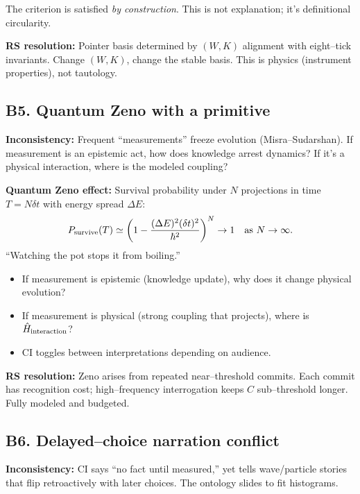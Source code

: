 \documentclass[11pt]{article}
\begin{document}
The criterion is satisfied \emph{by construction}. This is not explanation; it's definitional circularity.

\textbf{RS resolution:} Pointer basis determined by $(W,K)$ alignment with eight--tick invariants. Change $(W,K)$, change the stable basis. This is physics (instrument properties), not tautology.

\subsection{B5. Quantum Zeno with a primitive}

\begin{alertbox}
\textbf{Inconsistency:} Frequent ``measurements'' freeze evolution (Misra--Sudarshan). If measurement is an epistemic act, how does knowledge arrest dynamics? If it's a physical interaction, where is the modeled coupling?
\end{alertbox}

\textbf{Quantum Zeno effect:}
Survival probability under $N$ projections in time $T=N\delta t$ with energy spread $\Delta E$:
\begin{equation}
  P_{\rm survive}(T) \simeq \left(1 - \frac{(\Delta E)^2(\delta t)^2}{\hbar^2}\right)^N \to 1 \quad \text{as } N\to\infty.
\end{equation}
``Watching the pot stops it from boiling.''

\begin{itemize}[nosep]
  \item If measurement is epistemic (knowledge update), why does it change physical evolution?
  \item If measurement is physical (strong coupling that projects), where is $\hat H_{\rm interaction}$?
  \item CI toggles between interpretations depending on audience.
\end{itemize}

\textbf{RS resolution:} Zeno arises from repeated near--threshold commits. Each commit has recognition cost; high--frequency interrogation keeps $C$ sub--threshold longer. Fully modeled and budgeted.

\subsection{B6. Delayed--choice narration conflict}

\begin{alertbox}
\textbf{Inconsistency:} CI says ``no fact until measured,'' yet tells wave/particle stories that flip retroactively with later choices. The ontology slides to fit histograms.
\end{alertbox}
\end{document}
